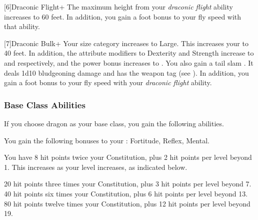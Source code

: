             [6]{Draconic Flight+} The maximum height from your \textit{draconic flight} ability increases to 60 feet.
            In addition, you gain a  foot bonus to your fly speed with that ability.

            [7]{Draconic Bulk+} Your size category increases to Large.
            This increases your  to 40 feet.
            In addition, the attribute modifiers to Dexterity and Strength increase to  and  respectively, and the power bonus increases to .
            You also gain a tail slam .
            It deals 1d10 bludgeoning damage and has the  weapon tag (see ).
            In addition, you gain a  foot bonus to your fly speed with your \textit{draconic flight} ability.

        \subsubsection{Base Class Abilities}
            If you choose dragon as your base class, you gain the following abilities.

            You gain the following bonuses to your :  Fortitude,  Reflex,  Mental.

                You have 8 hit points \add twice your Constitution, plus 2 hit points per level beyond 1.
                This increases as your level increases, as indicated below.
                \begin{itemize}
                     20 hit points \add three times your Constitution, plus 3 hit points per level beyond 7.
                     40 hit points \add six times your Constitution, plus 6 hit points per level beyond 13.
                     80 hit points \add twelve times your Constitution, plus 12 hit points per level beyond 19.
                \end{itemize}

